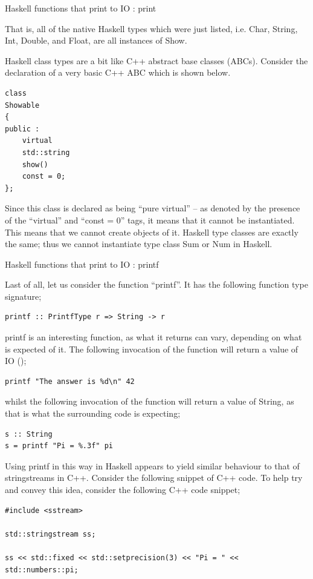 
\begin{frame}[t, fragile]{Haskell functions that print to IO : print}

That is, all of the native Haskell types which were just listed, i.e. Char, String, Int, Double, and Float, are all
instances of Show.

Haskell class types are a bit like C++ abstract base classes (ABCs). Consider the declaration of a very basic C++ ABC
which is shown below.

\begin{verbatim}
class
Showable
{
public :
    virtual
    std::string
    show()
    const = 0;
};
\end{verbatim}

Since this class is declared as being ``pure virtual'' -- as denoted by the presence of the ``virtual'' and
``const = 0'' tags, it means that it cannot be instantiated. This means that we cannot create objects of it. Haskell
type classes are exactly the same; thus we cannot instantiate type class Sum or Num in Haskell.

\end{frame}


\begin{frame}[t, fragile]{Haskell functions that print to IO : printf}

Last of all, let us consider the function ``printf''. It has the following function type signature;

\begin{verbatim}
printf :: PrintfType r => String -> r
\end{verbatim}

printf is an interesting function, as what it returns can vary, depending on what is expected of it. The following
invocation of the function will return a value of IO ();

\begin{verbatim}
printf "The answer is %d\n" 42
\end{verbatim}

whilst the following invocation of the function will return a value of String, as that is what the surrounding code
is expecting;

\begin{verbatim}
s :: String
s = printf "Pi = %.3f" pi
\end{verbatim}

Using printf in this way in Haskell appears to yield similar behaviour to that of stringstreams in C++. Consider the
following snippet of C++ code. To help try and convey this idea, consider the following C++ code snippet;

\begin{verbatim}
#include <sstream>

std::stringstream ss;

ss << std::fixed << std::setprecision(3) << "Pi = " << std::numbers::pi;
\end{verbatim}

\end{frame}


